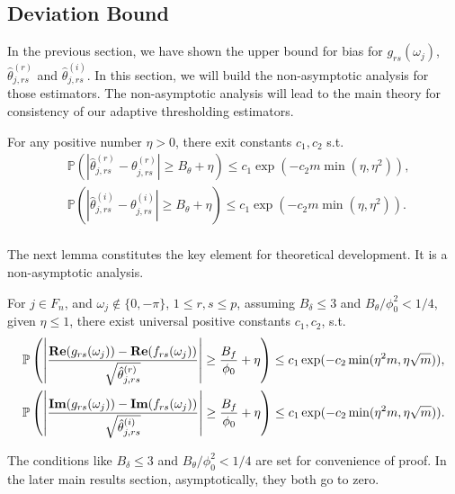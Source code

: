 \subsection{Deviation Bound} 
In the previous section,  we have shown the upper bound for bias for $g_{rs}(\omega_j)$, $\hat{\theta}^{(r)}_{j, rs}$ and $\hat{\theta}^{(i)}_{j, rs}$. In this section, we will build the non-asymptotic analysis for those estimators. The non-asymptotic analysis will lead to the
main theory for consistency of our adaptive thresholding estimators. 


\begin{lem}
\label{lemma: deviation_variance}
For any positive number $\eta>0$, there exit constants $c_1, c_2$ s.t.
\begin{equation}
\begin{aligned}
& \mathbb{P}\left(\left|\hat{\theta}^{(r)}_{j, rs} - \theta^{(r)}_{j, rs}\right|\ge  
B_\theta + \eta \right) \le  c_1\exp(-c_2m\min\left(\eta, \eta^2\right)), \\ 
& \mathbb{P}\left(\left|\hat{\theta}^{(i)}_{j, rs} - \theta^{(i)}_{j, rs}\right|\ge  
B_\theta + \eta \right) \le  c_1\exp(-c_2m\min\left(\eta, \eta^2\right)).\\ 
\end{aligned}
\end{equation}
\end{lem}
The next lemma constitutes the key element for theoretical development. It is a non-asymptotic analysis. 
\begin{lem}
\label{lemma: main_lemma}
For $j\in F_n$, and $\omega_j \notin \{0, -\pi\}$,  $1\le r, s\le p$, 
assuming $B_\delta\le 3$ and $B_\theta/\phi_0^2<1/4$, given $\eta\le 1$, there exist universal positive constants $c_1, c_2$, s.t. 
\begin{equation}
\begin{aligned}
& \mathbb{P}\left(\left|\frac{{\bf Re}(g_{rs}(\omega_j)) - {\bf Re}(f_{rs}(\omega_j))}{\sqrt{\hat{\theta}^{(r)}_{j,rs}}}\right| \ge \frac{B_f}{\phi_0}+\eta\right)\le c_1\exp(-c_2\min(\eta^2 m, \eta \sqrt{m})),\\
& \mathbb{P}\left(\left|\frac{{\bf Im}(g_{rs}(\omega_j)) - {\bf Im}(f_{rs}(\omega_j))}{\sqrt{\hat{\theta}^{(i)}_{j,rs}}}\right| \ge \frac{B_f}{\phi_0}+\eta\right)\le c_1\exp(-c_2\min(\eta^2 m, \eta \sqrt{m})).
\end{aligned}
\end{equation}
\end{lem}
\begin{remark}
The conditions like $B_\delta\le 3$ and $B_\theta/\phi_0^2<1/4$ are set for convenience of proof. In the later main results section, asymptotically, they both go to zero. 
\end{remark}

